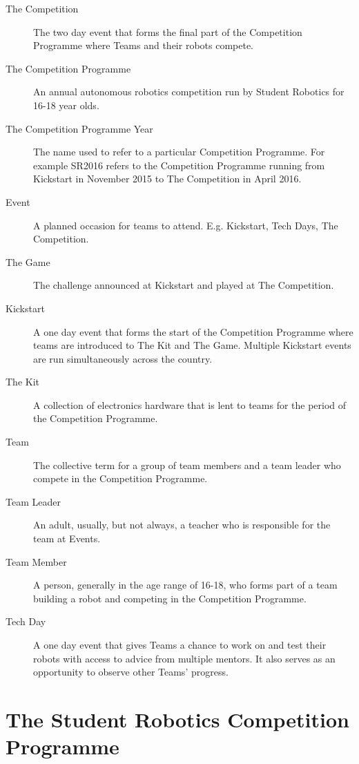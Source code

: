 \begin{description}
  \item[The Competition] The two day event that forms the final part of the Competition Programme where Teams and their robots compete.
  \item[The Competition Programme] An annual autonomous robotics competition run by Student Robotics for 16-18 year olds.
  \item[The Competition Programme Year] The name used to refer to a particular Competition Programme. For example SR2016 refers to the Competition Programme running from Kickstart in November 2015 to The Competition in April 2016.
  \item[Event] A planned occasion for teams to attend. E.g. Kickstart, Tech Days, The Competition.
  \item[The Game] The challenge announced at Kickstart and played at The Competition.
  \item[Kickstart] A one day event that forms the start of the Competition Programme where teams are introduced to The Kit and The Game. Multiple Kickstart events are run simultaneously across the country.
  \item[The Kit] A collection of electronics hardware that is lent to teams for the period of the Competition Programme.
  \item[Team] The collective term for a group of team members and a team leader who compete in the Competition Programme.
  \item[Team Leader] An adult, usually, but not always, a teacher who is responsible for the team at Events.
  \item[Team Member] A person, generally in the age range of 16-18, who forms part of a team building a robot and competing in the Competition Programme.
  \item[Tech Day] A one day event that gives Teams a chance to work on and test their robots with access to advice from multiple mentors. It also serves as an opportunity to observe other Teams' progress.
\end{description}

\section{The Student Robotics Competition Programme}

